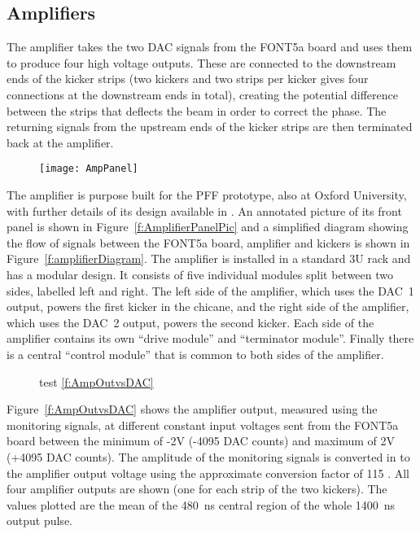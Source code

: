 \subsection{\label{ss:amp}Amplifiers}

The amplifier takes the two DAC signals from the FONT5a board and
uses them to produce four high voltage outputs. These are connected to the 
downstream ends of the kicker strips (two kickers and two strips per kicker 
gives four connections at the downstream ends in total), creating the potential 
difference between the strips that deflects the beam in order to correct the 
phase. The returning signals from the upstream ends of the kicker strips are 
then terminated back at the amplifier.

\begin{figure}
  \texttt{[image: AmpPanel]}%
  \caption{\label{f:AmpPanel}
  }
\end{figure}

The amplifier is purpose built for the PFF prototype, also at Oxford 
University, with further details of its design available in \cite{colinCLIC16}. 
An annotated picture of its front panel is shown in 
Figure~\ref{f:AmplifierPanelPic} and a simplified diagram showing the flow of 
signals between the FONT5a board, amplifier and kickers is shown in 
Figure~\ref{f:amplifierDiagram}.
The amplifier is installed in a standard 3U rack and has a modular design. It 
consists of five individual modules split between two sides, labelled left and 
right. The left side of the amplifier, which uses the DAC~1 output, powers the 
first kicker in the chicane, and the right side of the amplifier, which uses 
the DAC~2 output, powers the second kicker. Each side of the amplifier contains 
its own ``drive module'' and ``terminator module''. Finally there is a central 
``control module'' that is common to both sides of the amplifier.

\begin{figure}
  \hfill
  \caption{\label{f:AmpOutvsDACFig}test \ref{f:AmpOutvsDAC}}
\end{figure}

Figure~\ref{f:AmpOutvsDAC} shows the amplifier output, measured using the 
monitoring signals, at different constant input voltages sent from the FONT5a 
board between the minimum of -2V (-4095 DAC counts) and maximum of 2V (+4095 
DAC counts). The amplitude of the monitoring signals is converted in to the 
amplifier output voltage using the approximate conversion factor of 115 
\cite{colinPriv}. All four amplifier outputs are shown (one for each strip of 
the two kickers). The values plotted are the mean of the 480~ns central region 
of the whole 1400~ns output pulse.

